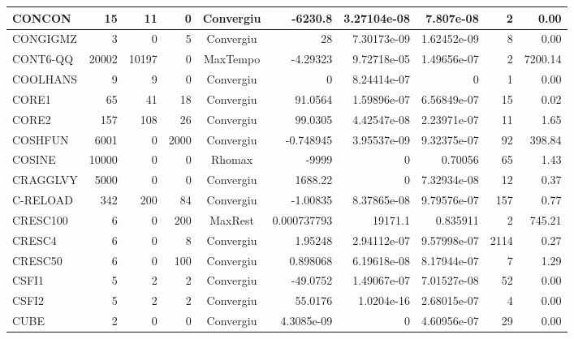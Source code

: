 \begin{center}
\begin{longtable}{|l|r|r|r|c|r|r|r|r|r|}
  CONCON &     15 &     11 &      0 & Convergiu  &     -6230.8 &    3.27104e-08 &   7.807e-08 &      2 &    0.00 \\ \hline
CONGIGMZ &      3 &      0 &      5 & Convergiu  &          28 &    7.30173e-09 & 1.62452e-09 &      8 &    0.00 \\ \hline
CONT6-QQ &  20002 &  10197 &      0 & MaxTempo   &    -4.29323 &    9.72718e-05 & 1.49656e-07 &      2 & 7200.14 \\ \hline
COOLHANS &      9 &      9 &      0 & Convergiu  &           0 &    8.24414e-07 &           0 &      1 &    0.00 \\ \hline
   CORE1 &     65 &     41 &     18 & Convergiu  &     91.0564 &    1.59896e-07 & 6.56849e-07 &     15 &    0.02 \\ \hline
   CORE2 &    157 &    108 &     26 & Convergiu  &     99.0305 &    4.42547e-08 & 2.23971e-07 &     11 &    1.65 \\ \hline
 COSHFUN &   6001 &      0 &   2000 & Convergiu  &   -0.748945 &    3.95537e-09 & 9.32375e-07 &     92 &  398.84 \\ \hline
  COSINE &  10000 &      0 &      0 & Rhomax     &       -9999 &              0 &     0.70056 &     65 &    1.43 \\ \hline
CRAGGLVY &   5000 &      0 &      0 & Convergiu  &     1688.22 &              0 & 7.32934e-08 &     12 &    0.37 \\ \hline
C-RELOAD &    342 &    200 &     84 & Convergiu  &    -1.00835 &    8.37865e-08 & 9.79576e-07 &    157 &    0.77 \\ \hline
CRESC100 &      6 &      0 &    200 & MaxRest    & 0.000737793 &        19171.1 &    0.835911 &      2 &  745.21 \\ \hline
  CRESC4 &      6 &      0 &      8 & Convergiu  &     1.95248 &    2.94112e-07 & 9.57998e-07 &   2114 &    0.27 \\ \hline
 CRESC50 &      6 &      0 &    100 & Convergiu  &    0.898068 &    6.19618e-08 & 8.17944e-07 &      7 &    1.29 \\ \hline
   CSFI1 &      5 &      2 &      2 & Convergiu  &    -49.0752 &    1.49067e-07 & 7.01527e-08 &     52 &    0.00 \\ \hline
   CSFI2 &      5 &      2 &      2 & Convergiu  &     55.0176 &     1.0204e-16 & 2.68015e-07 &      4 &    0.00 \\ \hline
    CUBE &      2 &      0 &      0 & Convergiu  &  4.3085e-09 &              0 & 4.60956e-07 &     29 &    0.00 \\ \hline

\end{longtable}
\end{center}
